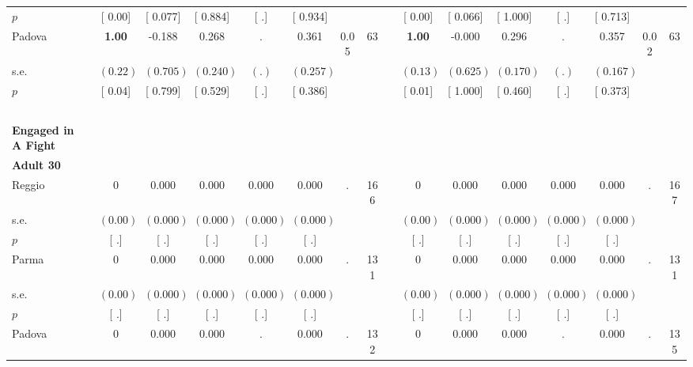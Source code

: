 \begin{longtable}{L{8em} c c c c c c c p{1em} c c c c c c c}
\quad \quad \quad \quad $ p$ & [     0.00] & [    0.077] & [    0.884] & [        .] & [    0.934] & & & & [     0.00] & [    0.066] & [    1.000] & [        .] & [    0.713] & &  \\[1em]
\quad \quad \quad Padova& \textbf{     1.00} &    -0.188 &     0.268 &         . &     0.361 &      0.05 &        63 & & \textbf{     1.00} &    -0.000 &     0.296 &         . &     0.357 &      0.02 &        63  \\*
\quad \quad \quad \quad s.e.& $ (     0.22)$ & $ (    0.705)$ & $ (    0.240)$ & $ (        .)$ & $ (    0.257)$ & & & & $ (     0.13)$ & $ (    0.625)$ & $ (    0.170)$ & $ (        .)$ & $ (    0.167)$ & &  \\*
\quad \quad \quad \quad $ p$ & [     0.04] & [    0.799] & [    0.529] & [        .] & [    0.386] & & & & [     0.01] & [    1.000] & [    0.460] & [        .] & [    0.373] & &  \\[1em]
~\\[1em]
\textbf{Engaged in A Fight} \\*
\quad \quad \textbf{Adult 30} & & & & & & & & & & & & & & & \\* 
\quad \quad \quad Reggio& 0 &     0.000 &     0.000 &     0.000 &     0.000 &         . &       166 & & 0 &     0.000 &     0.000 &     0.000 &     0.000 &         . &       167  \\*
\quad \quad \quad \quad s.e.& $ (     0.00)$ & $ (    0.000)$ & $ (    0.000)$ & $ (    0.000)$ & $ (    0.000)$ & & & & $ (     0.00)$ & $ (    0.000)$ & $ (    0.000)$ & $ (    0.000)$ & $ (    0.000)$ & &  \\*
\quad \quad \quad \quad $ p$ & [        .] & [        .] & [        .] & [        .] & [        .] & & & & [        .] & [        .] & [        .] & [        .] & [        .] & &  \\[1em]
\quad \quad \quad Parma& 0 &     0.000 &     0.000 &     0.000 &     0.000 &         . &       131 & & 0 &     0.000 &     0.000 &     0.000 &     0.000 &         . &       131  \\*
\quad \quad \quad \quad s.e.& $ (     0.00)$ & $ (    0.000)$ & $ (    0.000)$ & $ (    0.000)$ & $ (    0.000)$ & & & & $ (     0.00)$ & $ (    0.000)$ & $ (    0.000)$ & $ (    0.000)$ & $ (    0.000)$ & &  \\*
\quad \quad \quad \quad $ p$ & [        .] & [        .] & [        .] & [        .] & [        .] & & & & [        .] & [        .] & [        .] & [        .] & [        .] & &  \\[1em]
\quad \quad \quad Padova& 0 &     0.000 &     0.000 &         . &     0.000 &         . &       132 & & 0 &     0.000 &     0.000 &         . &     0.000 &         . &       135  \\*

\end{longtable}

